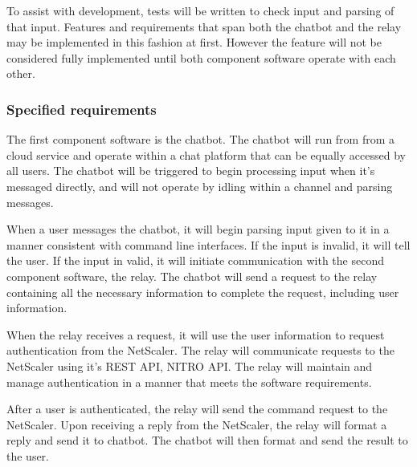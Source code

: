 To assist with development, tests will be written to check input and parsing of that input.
Features and requirements that span both the chatbot and the relay may be implemented in this fashion at first.
However the feature will not be considered fully implemented until both component software operate with each other.

\subsubsection{Specified requirements}
The first component software is the chatbot.
The chatbot will run from from a cloud service and operate within a chat platform that can be equally accessed by all users.
The chatbot will be triggered to begin processing input when it's messaged directly, and will not operate by idling within a channel and parsing messages.

When a user messages the chatbot, it will begin parsing input given to it in a manner consistent with command line interfaces.
If the input is invalid, it will tell the user.
If the input in valid, it will initiate communication with the second component software, the relay.
The chatbot will send a request to the relay containing all the necessary information to complete the request, including user information.

When the relay receives a request, it will use the user information to request authentication from the NetScaler.
The relay will communicate requests to the NetScaler using it's REST API, NITRO API.
The relay will maintain and manage authentication in a manner that meets the software requirements.

After a user is authenticated, the relay will send the command request to the NetScaler.
Upon receiving a reply from the NetScaler, the relay will format a reply and send it to chatbot.
The chatbot will then format and send the result to the user.
    
